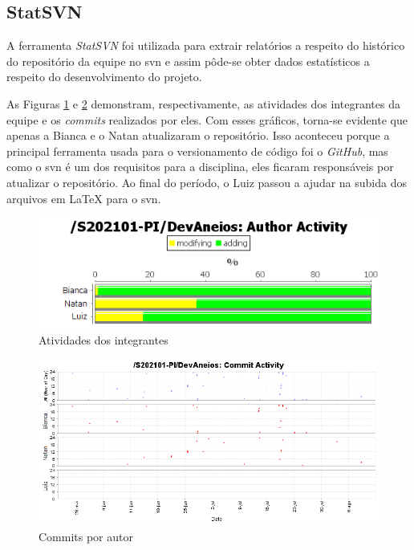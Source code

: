 \subsection{StatSVN}
A ferramenta \textit{StatSVN} foi utilizada para extrair relatórios a respeito do histórico do repositório da equipe no \gls{svn} e assim pôde-se obter dados estatísticos a respeito do desenvolvimento do projeto.

As Figuras \ref{fig:activity} e \ref{fig:commitsauthors} demonstram, respectivamente, as atividades dos integrantes da equipe e os \textit{commits} realizados por eles. Com esses gráficos, torna-se evidente que apenas a Bianca e o Natan atualizaram o repositório. Isso aconteceu porque a principal ferramenta usada para o versionamento de código foi o \textit{GitHub}, mas como o \gls{svn} é um dos requisitos para a disciplina, eles ficaram responsáveis por atualizar o repositório. Ao final do período, o Luiz passou a ajudar na subida dos arquivos em LaTeX para o \gls{svn}.
\begin{figure}[htb]
    \centering
	\includegraphics[width=16cm]{imagens/activity.png}
	\caption{\label{fig:activity} Atividades dos integrantes}
\end{figure}
\FloatBarrier

\begin{figure}[htb]
    \centering
	\includegraphics[width=16cm]{imagens/commitscatterauthors.png}
	\caption{\label{fig:commitsauthors} Commits por autor}
\end{figure}
\FloatBarrier

